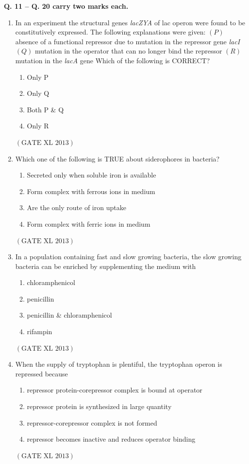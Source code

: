 \documentclass[12pt]{article}
\theoremstyle{remark}
\providecommand{\brak}[1]{\ensuremath{\left(#1\right)}}
\begin{document}
\noindent\textbf{Q. 11 – Q. 20 carry two marks each.}

\begin{enumerate}
\item In an experiment the structural genes \textit{lacZYA} of lac operon were found to be constitutively expressed. The following explanations were given:  
\brak{P} absence of a functional repressor due to mutation in the repressor gene \textit{lacI}  
\brak{Q} mutation in the operator that can no longer bind the repressor  
\brak{R} mutation in the \textit{lacA} gene  
Which of the following is CORRECT?
\begin{enumerate}
\item Only P
\item Only Q
\item Both P \& Q
\item Only R
\end{enumerate}
\hfill $\brak{\text{GATE XL 2013}}$

\item Which one of the following is TRUE about siderophores in bacteria?
\begin{enumerate}
\item Secreted only when soluble iron is available
\item Form complex with ferrous ions in medium
\item Are the only route of iron uptake
\item Form complex with ferric ions in medium
\end{enumerate}
\hfill $\brak{\text{GATE XL 2013}}$

\item In a population containing fast and slow growing bacteria, the slow growing bacteria can be enriched by supplementing the medium with
\begin{enumerate}
\item chloramphenicol
\item penicillin
\item penicillin \& chloramphenicol
\item rifampin
\end{enumerate}
\hfill $\brak{\text{GATE XL 2013}}$

\item When the supply of tryptophan is plentiful, the tryptophan operon is repressed because
\begin{enumerate}
\item repressor protein-corepressor complex is bound at operator
\item repressor protein is synthesized in large quantity
\item repressor-corepressor complex is not formed
\item repressor becomes inactive and reduces operator binding
\end{enumerate}
\hfill $\brak{\text{GATE XL 2013}}$


\end{enumerate}
\end{document}

